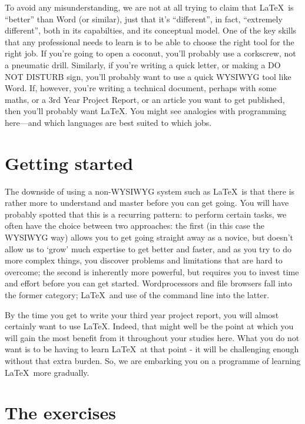 To avoid any  misunderstanding, we are not at all trying to claim that \LaTeX\ is ``better'' than Word (or similar), just that it's ``different'', in fact, ``extremely different'', both in its capabilties, and its conceptual model. One of the key skills that any professional needs to learn is to be able to choose the right tool for the right job. If you're going to open a coconut, you'll probably use a corkscrew, not a pneumatic drill. Similarly, if you're writing a quick letter, or making a DO NOT DISTURB sign, you'll probably want to use a quick WYSIWYG tool like Word. If, however, you're writing a technical document, perhaps with some maths, or a 3rd Year Project Report, or an article you want to get published, then you'll probably want \LaTeX.  You might see analogies with programming here---and which languages are best suited to which jobs.

\section{Getting started}

The downside of using a non-WYSIWYG system such as \LaTeX\ is that there is rather more to understand and master before you can get going. You will have probably spotted that this is a recurring pattern: to perform certain tasks, we often have the choice between two approaches: the first (in this case the WYSIWYG way) allows you to get going straight away as a novice, but doesn't allow us to `grow' much expertise to get better and faster, and as you try to do more complex things, you discover problems and limitations that are hard to overcome; the second is inherently more powerful, but requires you to invest time and effort before you can get started. Wordprocessors and file browsers fall into the former category; \LaTeX\ and use of the command line into the latter.

By the time you get to write your third year project report, you will almost certainly want to use \LaTeX. Indeed, that might well be the point at which you will gain the most benefit from it throughout your studies here. What you do not want is to be having to learn \LaTeX\ at that point - it will be challenging enough without that extra burden. So, we are embarking you on a programme of learning \LaTeX\ more gradually.


\section{The exercises}

